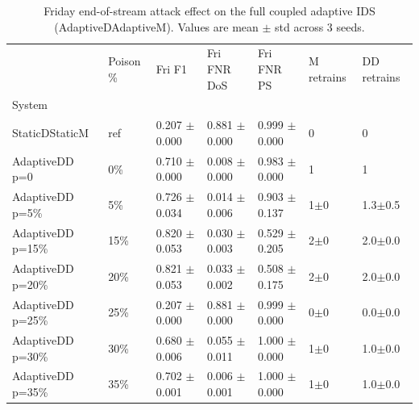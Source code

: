 \begin{table}
\caption{Friday end-of-stream attack effect on the full coupled adaptive IDS (AdaptiveDAdaptiveM). Values are mean $\pm$ std across 3 seeds.}
\label{tab:attack-fri-summary}
\begin{tabular}{lllllll}
\toprule
 & Poison \% & Fri F1 & Fri FNR DoS & Fri FNR PS & M retrains & DD retrains \\
System &  &  &  &  &  &  \\
\midrule
StaticDStaticM & ref & 0.207 $\pm$ 0.000 & 0.881 $\pm$ 0.000 & 0.999 $\pm$ 0.000 & 0 & 0 \\
AdaptiveDD p=0 & 0\% & 0.710 $\pm$ 0.000 & 0.008 $\pm$ 0.000 & 0.983 $\pm$ 0.000 & 1 & 1 \\
AdaptiveDD p=5\% & 5\% & 0.726 $\pm$ 0.034 & 0.014 $\pm$ 0.006 & 0.903 $\pm$ 0.137 & 1$\pm$0 & 1.3$\pm$0.5 \\
AdaptiveDD p=15\% & 15\% & 0.820 $\pm$ 0.053 & 0.030 $\pm$ 0.003 & 0.529 $\pm$ 0.205 & 2$\pm$0 & 2.0$\pm$0.0 \\
AdaptiveDD p=20\% & 20\% & 0.821 $\pm$ 0.053 & 0.033 $\pm$ 0.002 & 0.508 $\pm$ 0.175 & 2$\pm$0 & 2.0$\pm$0.0 \\
AdaptiveDD p=25\% & 25\% & 0.207 $\pm$ 0.000 & 0.881 $\pm$ 0.000 & 0.999 $\pm$ 0.000 & 0$\pm$0 & 0.0$\pm$0.0 \\
AdaptiveDD p=30\% & 30\% & 0.680 $\pm$ 0.006 & 0.055 $\pm$ 0.011 & 1.000 $\pm$ 0.000 & 1$\pm$0 & 1.0$\pm$0.0 \\
AdaptiveDD p=35\% & 35\% & 0.702 $\pm$ 0.001 & 0.006 $\pm$ 0.001 & 1.000 $\pm$ 0.000 & 1$\pm$0 & 1.0$\pm$0.0 \\
\bottomrule
\end{tabular}
\end{table}
